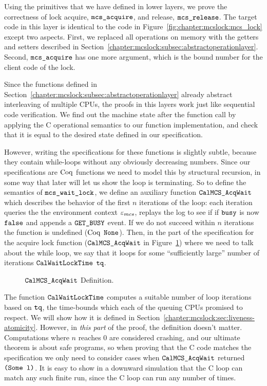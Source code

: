 Using the primitives that we have defined in lower layers, we prove the correctness of lock acquire, ${\mathrm{\texttt{mcs\_acquire}}}$, and release, ${\mathrm{\texttt{mcs\_release}}}$.
The target code in this layer is identical to the code in Figure~\ref{fig:chapter:mcslock:mcs_lock} except two aspects. 
First, we replaced all operations on memory with the getters and setters described in Section~\ref{chapter:mcslock:subsec:abstractoperationlayer}.
Second, ${\mathrm{\texttt{mcs\_acquire}}}$ has one more
 argument, which is the bound number for the client code of the lock.

Since the functions defined in
Section~\ref{chapter:mcslock:subsec:abstractoperationlayer} already abstract interleaving
of multiple CPUs, the proofs in this layers work just like sequential
code verification. We find out the machine state after the function
call by applying the C operational semantics to our function
implementation, and check that it is equal to the desired state
defined in our specification.

However, writing the specifications for these functions is slightly subtle, 
because they contain
while-loops without any obviously decreasing numbers. Since our
specifications are $\mathrm{Coq}$ functions we need to model this by structural
recursion, in some way that later will let us show the loop is terminating.
So to define the semantics of ${\mathrm{\texttt{mcs\_wait\_lock}}}$,
we define an auxiliary function
${\mathrm{\texttt{CalMCS\_AcqWait}}}$ which describes the
behavior of the first $n$ iterations of the loop: each iteration
queries the the environment context ${\varepsilon}_{mcs}$, replays the log to see if if ${\mathrm{\texttt{busy}}}$ is now ${{\mathrm{\texttt{false}}}}$ and appends a ${\mathrm{\texttt{GET\_BUSY}}}$ event.
If we do not succeed within $n$ iterations the function is undefined ($\mathrm{Coq}$ ${\mathrm{\texttt{None}}}$).
Then, in the part of the  specification for the  acquire lock 
function (${\mathrm{\texttt{CalMCS\_AcqWait}}}$ in Figure~\ref{fig:chapter:mcslock:calmcsacqwait}) where we need to talk about the while loop,
we say that it loops for some ``sufficiently large'' 
number of iterations ${\mathrm{\texttt{CalWaitLockTime}}}$  ${\mathrm{\texttt{tq}}}$. 
\begin{figure}

\caption{${\mathrm{\texttt{CalMCS\_AcqWait}}}$ Definition.}
\label{fig:chapter:mcslock:calmcsacqwait}
\end{figure}
The function ${\mathrm{\texttt{CalWaitLockTime}}}$ computes a suitable 
number of loop iterations based on ${\mathrm{\texttt{tq}}}$, the time-bounds  which each of the queuing CPUs promised to respect.
We will show how it is defined in Section~\ref{chapter:mcslock:sec:liveness-atomicity}. 
However, in \emph{this part} of the proof, the definition doesn't matter. 
Computations where $n$ reaches 0 are considered crashing, and our
ultimate theorem is about safe programs, so when proving that the C
code matches the specification we only need to 
consider cases when ${\mathrm{\texttt{CalMCS\_AcqWait}}}$ returned ${\mathrm{\texttt{(}}}{\mathrm{\texttt{Some}}}{\mathrm{\texttt{ l)}}}$.
It is easy to show in a downward simulation that the C loop can match any such finite run, 
since the C loop can run any number of times.


